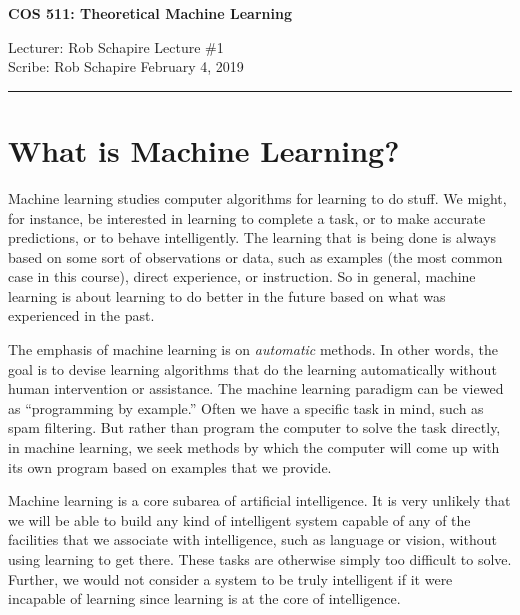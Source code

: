 \documentclass[11pt]{article}
\newcommand{\draftnotice}{\vbox to 0.25in{\noindent
   \raisebox{0.6in}[0in][0in]{\makebox[\textwidth][r]{\it
    DRAFT --- a final version will be posted shortly}}}
   \vspace{-.25in}\vspace{-\baselineskip}
}
\begin{document}
\thispagestyle{empty}


\begin{center}
\bf\large COS 511: Theoretical Machine Learning
\end{center}

\noindent
Lecturer: Rob Schapire    %
\hfill
Lecture \#1               %
\\
Scribe: Rob Schapire      %
\hfill
February 4, 2019          %

\noindent
\rule{\textwidth}{1pt}

\medskip


\section{What is Machine Learning?}

Machine learning studies computer algorithms for learning to do stuff.
We might, for instance, be interested in learning to complete a task,
or to make accurate predictions, or to behave intelligently.
The learning that is being done is always based on some sort of
observations or data, such as examples (the most common case in this
course), direct experience, or instruction.
So in general, machine learning is about learning to do better in the
future based on what was experienced in the past.

The emphasis of machine learning is on {\em automatic} methods.
In other words, the goal is to devise learning algorithms that do the
learning automatically without human intervention or assistance.
The machine learning paradigm can be viewed as ``programming by
example.''
Often we have a specific task in mind, such as spam filtering.
But rather than program the computer to solve the task directly, in
machine learning, we seek methods by which the computer will come up
with its own program based on examples that we provide.

Machine learning is a core subarea of artificial intelligence.
It is very unlikely that we will be able to build any kind of
intelligent system capable of any of the facilities that we associate
with intelligence, such as language or vision, without using learning
to get there.
These tasks are otherwise simply too difficult to solve.
Further, we would not consider a system to be truly intelligent if it
were incapable of learning since learning is at the core of
intelligence.
\end{document}
